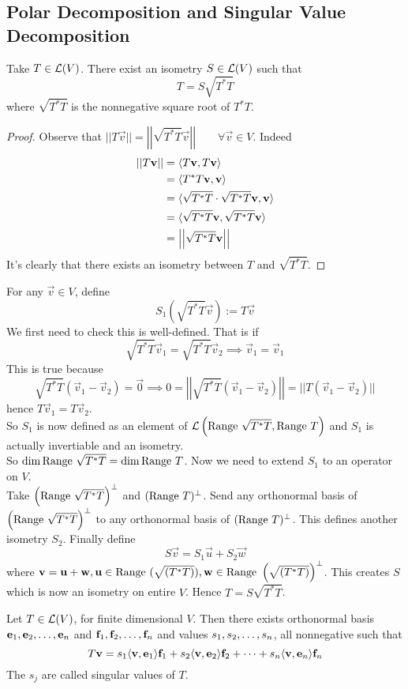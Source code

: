 \subsection{Polar Decomposition and Singular Value Decomposition}
\begin{theorem}
	Take $T \in \mathcal L(V)$. There exist an isometry $S \in \mathcal L(V)$ such that
	\[ T = S \sqrt{T^*T}\]
	where $\sqrt{T^*T}$ is the nonnegative square root of $T^*T$.
\end{theorem}
\begin{proof}
	Observe that $||T\vec v || = \left|\left|\sqrt{T^*T} \vec v\right|\right| \qquad \forall \vec v \in V$. Indeed 
	\begin{align*}
		||T\mathbf v|| &= \langle T\mathbf v, T \mathbf v \rangle \\
		&= \langle T^*T \mathbf v, \mathbf v \rangle \\
		&= \langle \sqrt{T^*T} \cdot \sqrt{T^*T} \mathbf v, \mathbf v \rangle \\
		&= \langle \sqrt{T^*T} \mathbf v, \sqrt{T^*T} \mathbf v \rangle \\
		&= \left|\left| \sqrt{T^*T} \mathbf v \right|\right|
	\end{align*}
	It's clearly that there exists an isometry between $T$ and $\sqrt{T^*T}$.
\end{proof}
\begin{remark}[Construction of $S$]
	For any $\vec v \in V$, define
	\[ S_1\left( \sqrt{T^*T} \vec v\right) := T \vec v\]
	We first need to check this is well-defined. That is  if 
	\[ \sqrt{T^*T} \vec v_1 = \sqrt{T^*T} \vec v_2 \implies \vec v_1 = \vec v_1\]
	This is true because 
	\[ \sqrt{T^*T}(\vec v_1 - \vec v_2) = \vec 0 \implies 0 = \left|\left| \sqrt{T^*T} (\vec v_1 - \vec v_2)\right|\right| = ||T(\vec v_1 - \vec v_2)||\]
	hence $T\vec v_1 = T\vec v_2$. \\
	So $S_1$ is now defined as an element of $\mathcal L\left(\text{Range } \sqrt{T^*T}, \text{Range } T\right)$ and $S_1$ is actually invertiable and an isometry. \\
	So $\dim \text{Range } \sqrt{T^*T} = \dim \text{Range } T$. Now we need to extend $S_1$ to an operator on $V$. \\ 
	Take $\left(\text{Range } \sqrt{T^*T}\right)^\perp$ and $(\text{Range } T)^\perp$. Send any orthonormal basis of $\left(\text{Range } \sqrt{T^*T}\right)^\perp$ to any orthonormal basis of $(\text{Range } T)^\perp$. This defines another isometry $S_2$.
	Finally define  
	\[ S\vec v = S_1 \vec u + S_2 \vec w\] where $\mathbf v = \mathbf u + \mathbf w , \mathbf u \in \text{Range } (\sqrt{(T^*T)}), \mathbf w \in \text{Range } \left(\sqrt{(T^*T)}\right)^\perp$. This creates $S$ which is now an isometry on entire $V$. Hence $T = S \sqrt{T^*T}$.
\end{remark}
\begin{theorem}
	Let $T \in \mathcal L(V)$, for finite dimensional $V$. Then there exists orthonormal basis ${\mathbf e}_1,{\mathbf e}_2, \ldots, {\mathbf e}_{n}$ and ${\mathbf f}_1,{\mathbf f}_2, \ldots, {\mathbf f}_{n}$ and values ${s}_1,{s}_2, \ldots, {s}_{n}$, all nonnegative such that 
	\[ T\mathbf v = s_1 \langle \mathbf v, \mathbf e_1 \rangle \mathbf f_1 + s_2 \langle \mathbf v, \mathbf e_2 \rangle \mathbf f_2 + \cdots + s_n \langle \mathbf v, \mathbf e_n \rangle \mathbf f_n\]
	The $s_j$ are called singular values of $T$.
\end{theorem}

